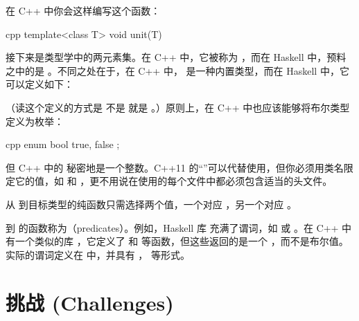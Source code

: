 在 C++ 中你会这样编写这个函数：

\begin{snip}{cpp}
  template<class T>
  void unit(T) {}
\end{snip}
接下来是类型学中的两元素集。在 C++ 中，它被称为 ，而在 Haskell 中，预料之中的是 。不同之处在于，在 C++ 中， 是一种内置类型，而在 Haskell 中，它可以定义如下：

（读这个定义的方式是  不是  就是 。）原则上，在 C++ 中也应该能够将布尔类型定义为枚举：

\begin{snip}{cpp}
  enum bool {
    true,
    false
  };
\end{snip}
但 C++ 中的  秘密地是一个整数。C++11 的“”可以代替使用，但你必须用类名限定它的值，如  和 ，更不用说在使用的每个文件中都必须包含适当的头文件。

从  到目标类型的纯函数只需选择两个值，一个对应 ，另一个对应 。

到  的函数称为（predicates）。例如，Haskell 库  充满了谓词，如  或 。在 C++ 中有一个类似的库 \code{}，它定义了  和  等函数，但这些返回的是一个 ，而不是布尔值。实际的谓词定义在  中，并具有 ， 等形式。

\section{挑战 (Challenges)}

